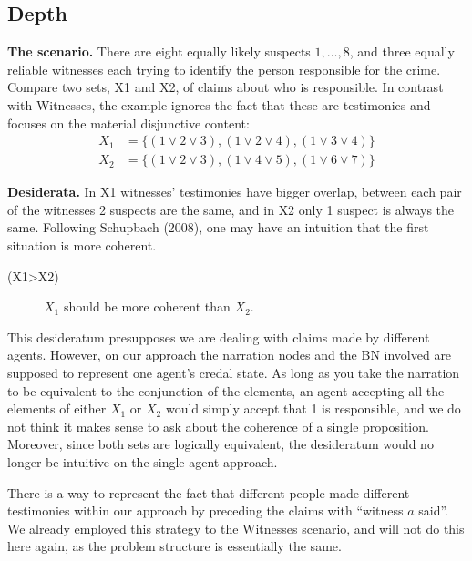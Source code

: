 \documentclass[
  10pt,
]{scrartcl}
\newcommand{\s}[1]{\textsf{#1}}
\begin{document}
\hypertarget{depth}{%
\subsection{Depth}\label{depth}}

\textbf{The scenario.} There are eight equally likely suspects \(1, \dots, 8\), and three equally reliable witnesses each trying to identify the person responsible for the crime. Compare two sets, \s{X1} and \s{X2}, of claims about who is responsible. In contrast with Witnesses, the example ignores the fact that these are testimonies and focuses on the material disjunctive content:
\begin{align*}
    X_1 & = \{(1 \vee 2 \vee 3), (1\vee 2 \vee 4), (1 \vee 3 \vee 4)\}\\
    X_2 & =  \{(1 \vee 2 \vee 3), (1\vee  4 \vee 5), (1 \vee 6 \vee 7)\}
\end{align*}

\noindent \textbf{Desiderata.} In \s{X1} witnesses' testimonies have bigger overlap, between each pair of the witnesses 2 suspects are the same, and in \s{X2} only 1 suspect is always the same. Following Schupbach (2008), one may have an intuition that the first situation is more coherent.
\vspace{2mm}

\begin{description}
    \item[(\s{X1\textgreater X2})] $X_1$  should be more coherent than $X_2$.
\end{description}\vspace{2mm}

This desideratum presupposes we are dealing with claims made by different agents. However, on our approach the narration nodes and the BN involved are supposed to represent one agent's credal state. As long as you take the narration to be equivalent to the conjunction of the elements, an agent accepting all the elements of either \(X_1\) or \(X_2\) would simply accept that 1 is responsible, and we do not think it makes sense to ask about the coherence of a single proposition. Moreover, since both sets are logically equivalent, the desideratum would no longer be intuitive on the single-agent approach.

There is a way to represent the fact that different people made different testimonies within our approach by preceding the claims with ``witness \(a\) said''. We already employed this strategy to the Witnesses scenario, and will not do this here again, as the problem structure is essentially the same.
\end{document}
